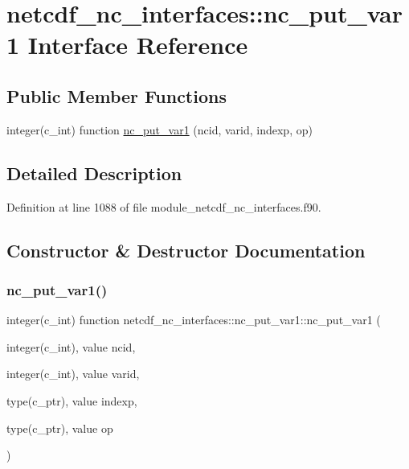 \hypertarget{interfacenetcdf__nc__interfaces_1_1nc__put__var1}{}\section{netcdf\+\_\+nc\+\_\+interfaces\+:\+:nc\+\_\+put\+\_\+var1 Interface Reference}
\label{interfacenetcdf__nc__interfaces_1_1nc__put__var1}
\subsection*{Public Member Functions}
\begin{DoxyCompactItemize}
\item 
integer(c\+\_\+int) function \hyperlink{interfacenetcdf__nc__interfaces_1_1nc__put__var1_a5a74e88cac86e28a8bfafb6dbc646cef}{nc\+\_\+put\+\_\+var1} (ncid, varid, indexp, op)
\end{DoxyCompactItemize}


\subsection{Detailed Description}


Definition at line 1088 of file module\+\_\+netcdf\+\_\+nc\+\_\+interfaces.\+f90.



\subsection{Constructor \& Destructor Documentation}
\mbox{\label{interfacenetcdf__nc__interfaces_1_1nc__put__var1_a5a74e88cac86e28a8bfafb6dbc646cef}} 
\subsubsection{\texorpdfstring{nc\+\_\+put\+\_\+var1()}{nc\_put\_var1()}}
{\footnotesize\ttfamily integer(c\+\_\+int) function netcdf\+\_\+nc\+\_\+interfaces\+::nc\+\_\+put\+\_\+var1\+::nc\+\_\+put\+\_\+var1 (\begin{DoxyParamCaption}\item[{integer(c\+\_\+int), value}]{ncid,  }\item[{integer(c\+\_\+int), value}]{varid,  }\item[{type(c\+\_\+ptr), value}]{indexp,  }\item[{type(c\+\_\+ptr), value}]{op }\end{DoxyParamCaption})}



